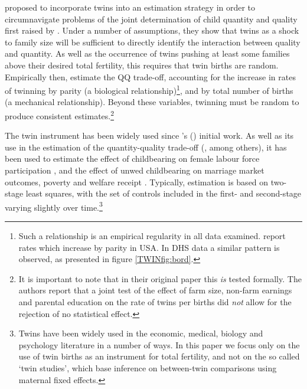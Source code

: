 \citet{RosenzweigWolpin1980} proposed to incorporate twins into an estimation
strategy in order to circumnavigate problems of the joint determination of child 
quantity and quality first raised by \citet{Becker1960,BeckerLewis1973,
Willis1973,DeTray1973,BeckerTomes1976}.  Under a number of assumptions, they show 
that twins as a shock to family size will be sufficient to directly identify the 
interaction between quality and quantity.  As well as the occurrence of twins 
pushing at least some families above their desired total fertility, this requires 
that twin births are random.  Empirically then, \citet{RosenzweigWolpin1980} 
estimate the QQ trade-off, accounting for the increase in rates of twinning by 
parity (a biological relationship)\footnote{Such a relationship is an empirical 
regularity in all data examined. \citet{RosenzweigWolpin1980} report rates which 
increase by parity in USA.  In DHS data a similar pattern is observed, as 
presented in figure \ref{TWINfig:bord}.}, and by total number of births (a 
mechanical relationship).  Beyond these variables, twinning must be random to
produce consistent estimates.\footnote{It is important to note that in their
original paper this \emph{is} tested formally.  The authors report that a joint
test of the effect of farm size, non-farm earnings and parental education on the
rate of twins per births did \emph{not} allow for the rejection of no 
statistical effect.}

The twin instrument has been widely used since \citeauthor{RosenzweigWolpin1980}'s
(\citeyear{RosenzweigWolpin1980}) initial work. As well as its use in the 
estimation of the quantity-quality trade-off (\citet{Blacketal2005,Caceres2006,
Lietal2008,Angristetal2010}, among others), it has been used to 
estimate the effect of childbearing on female labour force participation 
\citep{RosenzweigWolpin1980b,Jacobsenetal1999,AngristEvans1998}, and the effect 
of unwed childbearing on marriage market outcomes, poverty and welfare receipt 
\citep{BronarsGrogger1994}.  Typically, estimation is based on two-stage least
squares, with the set of controls included in the first- and second-stage 
varying slightly over time.\footnote{Twins have been widely used in the economic, 
medical, biology and psychology literature in a number of ways.  In this paper 
we focus only on the use of twin births as an instrument for total fertility, 
and not on the so called `twin studies', which base inference on between-twin 
comparisons using maternal fixed effects.}

